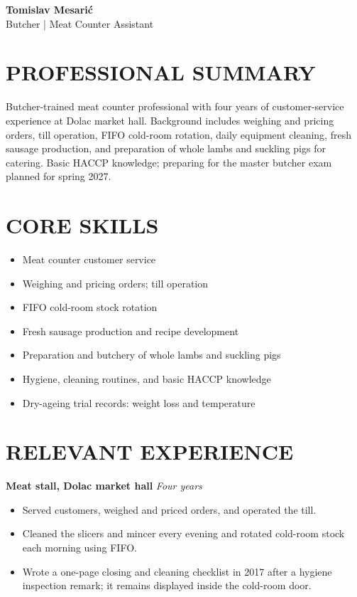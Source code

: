 \documentclass[11pt,a4paper]{article}
\begin{document}
\begin{center}
{\Huge\bfseries\color{primarycolor} Tomislav Mesarić}\\[0.3em]
{\large\color{accentcolor} Butcher | Meat Counter Assistant}
\end{center}

\section*{PROFESSIONAL SUMMARY}
Butcher-trained meat counter professional with four years of customer-service experience at Dolac market hall. Background includes weighing and pricing orders, till operation, FIFO cold-room rotation, daily equipment cleaning, fresh sausage production, and preparation of whole lambs and suckling pigs for catering. Basic HACCP knowledge; preparing for the master butcher exam planned for spring 2027.

\section*{CORE SKILLS}
\begin{itemize}
\item Meat counter customer service
\item Weighing and pricing orders; till operation
\item FIFO cold-room stock rotation
\item Fresh sausage production and recipe development
\item Preparation and butchery of whole lambs and suckling pigs
\item Hygiene, cleaning routines, and basic HACCP knowledge
\item Dry-ageing trial records: weight loss and temperature
\end{itemize}

\section*{RELEVANT EXPERIENCE}
\textbf{Meat stall, Dolac market hall} \hfill \textit{Four years}
\begin{itemize}
\item Served customers, weighed and priced orders, and operated the till.
\item Cleaned the slicers and mincer every evening and rotated cold-room stock each morning using FIFO.
\item Wrote a one-page closing and cleaning checklist in 2017 after a hygiene inspection remark; it remains displayed inside the cold-room door.
\end{itemize}
\end{document}
